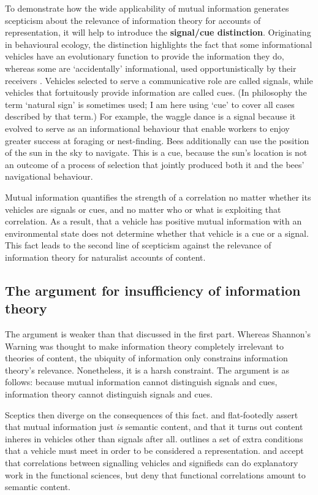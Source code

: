 To demonstrate how the wide applicability of mutual information generates scepticism about the relevance of information theory for accounts of representation, it will help to introduce the \textbf{signal/cue distinction}.
Originating in behavioural ecology, the distinction highlights the fact that some informational vehicles have an evolutionary function to provide the information they do, whereas some are `accidentally' informational, used opportunistically by their receivers \citep[PAGES]{maynardsmith2003animal}.
Vehicles selected to serve a communicative role are called signals, while vehicles that fortuitously provide information are called cues.
(In philosophy the term `natural sign' is sometimes used; I am here using `cue' to cover all cases described by that term.)
For example, the waggle dance is a signal because it evolved to serve as an informational behaviour that enable workers to enjoy greater success at foraging or nest-finding.
Bees additionally can use the position of the sun in the sky to navigate.
This is a cue, because the sun's location is not an outcome of a process of selection that jointly produced both it and the bees' navigational behaviour.

Mutual information quantifies the strength of a correlation no matter whether its vehicles are signals or cues, and no matter who or what is exploiting that correlation.
As a result, that a vehicle has positive mutual information with an environmental state does not determine whether that vehicle is a cue or a signal.
This fact leads to the second line of scepticism against the relevance of information theory for naturalist accounts of content.

\subsection{The argument for insufficiency of information theory}

The argument is weaker than that discussed in the first part.
Whereas Shannon's Warning was thought to make information theory completely irrelevant to theories of content, the ubiquity of information only constrains information theory's relevance.
Nonetheless, it is a harsh constraint.
The argument is as follows: because mutual information cannot distinguish signals and cues, information theory cannot distinguish signals and cues.

Sceptics then diverge on the consequences of this fact.
\citet{skyrms2010signals} and \citet{isaac2018semantics} flat-footedly assert that mutual information just \textit{is} semantic content, and that it turns out content inheres in vehicles other than signals after all.
\citet[SECTION]{shea2018representation} outlines a set of extra conditions that a vehicle must meet in order to be considered a representation. 
\citet{lean2014shannon} and \citet[CHAPTER]{hutto2017evolving} accept that correlations between signalling vehicles and signifieds can do explanatory work in the functional sciences, but deny that functional correlations amount to semantic content.

